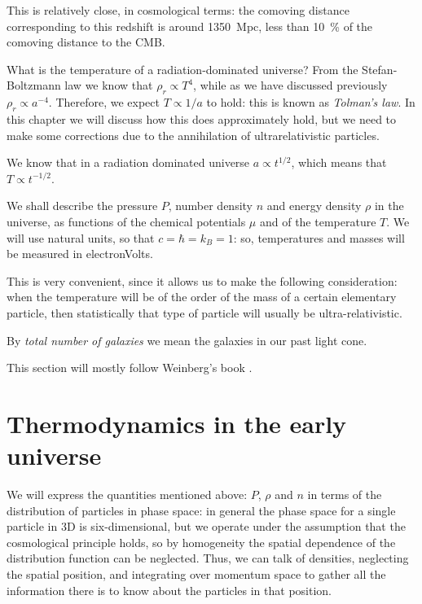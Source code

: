 \documentclass[main.tex]{subfiles}
\begin{document}
This is relatively close, in cosmological terms: the comoving distance corresponding to this redshift is around \SI{1350}{Mpc}, less than \SI{10}{\percent} of the comoving distance to the CMB. 


What is the temperature of a radiation-dominated universe?
From the Stefan-Boltzmann law we know that \(\rho _r \propto T^{4}\), while as we have discussed previously \(\rho _r \propto a^{-4}\).
Therefore, we expect \(T \propto 1/a\) to hold: this is known as \emph{Tolman's law}.
In this chapter we will discuss how this does approximately hold, but we need to make some corrections due to the annihilation of ultrarelativistic particles.

We know that in a radiation dominated universe \(a \propto t^{1/2}\), which means that \(T \propto t^{-1/2}\).

We shall describe the pressure \(P\), number density \(n\) and energy density \(\rho  \) in the universe, as functions of the chemical potentials \(\mu \) and of  the temperature \(T\).
We will use natural units, so that \(c= \hbar = k_B = 1\): so, temperatures and masses will be measured in electronVolts. 

This is very convenient, since it allows us to make the following consideration: when the temperature will be of the order of the mass of a certain elementary particle, then statistically that type of particle will usually be ultra-relativistic.


By \emph{total number of galaxies} we mean the galaxies in our past light cone.

This section will mostly follow Weinberg's book \cite[page 538, section 15.6]{weinbergGravitationCosmologyPrinciples1972}.

\section{Thermodynamics in the early universe}

We will express the quantities mentioned above: \(P\), \(\rho \) and \(n\) in terms of the distribution of particles in phase space: in general the phase space for a single particle in 3D is six-dimensional, but we operate under the assumption that the cosmological principle holds, so by homogeneity the spatial dependence of the distribution function can be neglected. 
Thus, we can talk of densities, neglecting the spatial position, and integrating over momentum space to gather all the information there is to know about the particles in that position.
\end{document}
